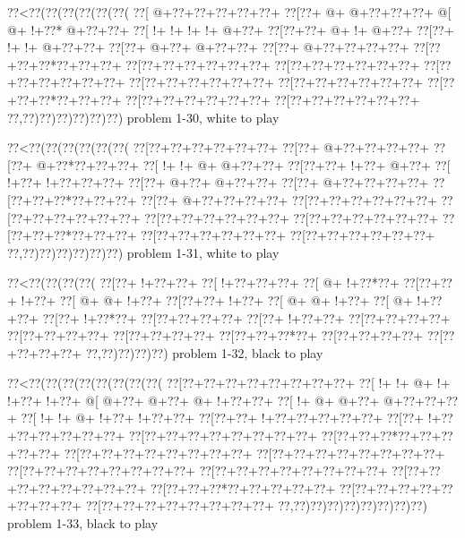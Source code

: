 \vbox{\vbox{\goo
\0??<\0??(\0??(\0??(\0??(\0??(\0??(
\0??[\- @+\0??+\0??+\0??+\0??+\0??+
\0??[\0??+\- @+\- @+\0??+\0??+\0??+
\- @[\- @+\- !+\0??*\- @+\0??+\0??+
\0??[\- !+\- !+\- !+\- !+\- @+\0??+
\0??[\0??+\0??+\- @+\- !+\- @+\0??+
\0??[\0??+\- !+\- !+\- @+\0??+\0??+
\0??[\0??+\- @+\0??+\- @+\0??+\0??+
\0??[\0??+\- @+\0??+\0??+\0??+\0??+
\0??[\0??+\0??+\0??*\0??+\0??+\0??+
\0??[\0??+\0??+\0??+\0??+\0??+\0??+
\0??[\0??+\0??+\0??+\0??+\0??+\0??+
\0??[\0??+\0??+\0??+\0??+\0??+\0??+
\0??[\0??+\0??+\0??+\0??+\0??+\0??+
\0??[\0??+\0??+\0??+\0??+\0??+\0??+
\0??[\0??+\0??+\0??*\0??+\0??+\0??+
\0??[\0??+\0??+\0??+\0??+\0??+\0??+
\0??[\0??+\0??+\0??+\0??+\0??+\0??+
\0??,\0??)\0??)\0??)\0??)\0??)\0??)
}
\hfil problem 1-30, white to play\hfil\break
}

\vbox{\vbox{\goo
\0??<\0??(\0??(\0??(\0??(\0??(\0??(
\0??[\0??+\0??+\0??+\0??+\0??+\0??+
\0??[\0??+\- @+\0??+\0??+\0??+\0??+
\0??[\0??+\- @+\0??*\0??+\0??+\0??+
\0??[\- !+\- !+\- @+\- @+\0??+\0??+
\0??[\0??+\0??+\- !+\0??+\- @+\0??+
\0??[\- !+\0??+\- !+\0??+\0??+\0??+
\0??[\0??+\- @+\0??+\- @+\0??+\0??+
\0??[\0??+\- @+\0??+\0??+\0??+\0??+
\0??[\0??+\0??+\0??*\0??+\0??+\0??+
\0??[\0??+\- @+\0??+\0??+\0??+\0??+
\0??[\0??+\0??+\0??+\0??+\0??+\0??+
\0??[\0??+\0??+\0??+\0??+\0??+\0??+
\0??[\0??+\0??+\0??+\0??+\0??+\0??+
\0??[\0??+\0??+\0??+\0??+\0??+\0??+
\0??[\0??+\0??+\0??*\0??+\0??+\0??+
\0??[\0??+\0??+\0??+\0??+\0??+\0??+
\0??[\0??+\0??+\0??+\0??+\0??+\0??+
\0??,\0??)\0??)\0??)\0??)\0??)\0??)
}
\hfil problem 1-31, white to play\hfil\break
}

\vbox{\vbox{\goo
\0??<\0??(\0??(\0??(\0??(
\0??[\0??+\- !+\0??+\0??+
\0??[\- !+\0??+\0??+\0??+
\0??[\- @+\- !+\0??*\0??+
\0??[\0??+\0??+\- !+\0??+
\0??[\- @+\- @+\- !+\0??+
\0??[\0??+\0??+\- !+\0??+
\0??[\- @+\- @+\- !+\0??+
\0??[\- @+\- !+\0??+\0??+
\0??[\0??+\- !+\0??*\0??+
\0??[\0??+\0??+\0??+\0??+
\0??[\0??+\- !+\0??+\0??+
\0??[\0??+\0??+\0??+\0??+
\0??[\0??+\0??+\0??+\0??+
\0??[\0??+\0??+\0??+\0??+
\0??[\0??+\0??+\0??*\0??+
\0??[\0??+\0??+\0??+\0??+
\0??[\0??+\0??+\0??+\0??+
\0??,\0??)\0??)\0??)\0??)
}
\hfil problem 1-32, black to play\hfil\break
}

\vbox{\vbox{\goo
\0??<\0??(\0??(\0??(\0??(\0??(\0??(\0??(\0??(
\0??[\0??+\0??+\0??+\0??+\0??+\0??+\0??+\0??+
\0??[\- !+\- !+\- @+\- !+\- !+\0??+\- !+\0??+
\- @[\- @+\0??+\- @+\0??+\- @+\- !+\0??+\0??+
\0??[\- !+\- @+\- @+\0??+\- @+\0??+\0??+\0??+
\0??[\- !+\- !+\- @+\- !+\0??+\- !+\0??+\0??+
\0??[\0??+\0??+\- !+\0??+\0??+\0??+\0??+\0??+
\0??[\0??+\- !+\0??+\0??+\0??+\0??+\0??+\0??+
\0??[\0??+\0??+\0??+\0??+\0??+\0??+\0??+\0??+
\0??[\0??+\0??+\0??*\0??+\0??+\0??+\0??+\0??+
\0??[\0??+\0??+\0??+\0??+\0??+\0??+\0??+\0??+
\0??[\0??+\0??+\0??+\0??+\0??+\0??+\0??+\0??+
\0??[\0??+\0??+\0??+\0??+\0??+\0??+\0??+\0??+
\0??[\0??+\0??+\0??+\0??+\0??+\0??+\0??+\0??+
\0??[\0??+\0??+\0??+\0??+\0??+\0??+\0??+\0??+
\0??[\0??+\0??+\0??*\0??+\0??+\0??+\0??+\0??+
\0??[\0??+\0??+\0??+\0??+\0??+\0??+\0??+\0??+
\0??[\0??+\0??+\0??+\0??+\0??+\0??+\0??+\0??+
\0??,\0??)\0??)\0??)\0??)\0??)\0??)\0??)\0??)
}
\hfil problem 1-33, black to play\hfil\break
}

